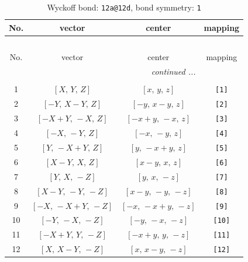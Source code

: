 \documentclass[fleqn,8pt]{jsarticle}
\begin{document}
\begin{longtable}{cccc}
\caption{Wyckoff bond: {\tt 12a@12d}, bond symmetry: {\tt 1}}
 \\
 \hline \hline
No. & vector & center & mapping \\ \hline \endfirsthead

\multicolumn{3}{l}{\tablename\ \thetable{}} \\
 \hline \hline
No. & vector & center & mapping \\ \hline \endhead

 \hline \hline
\multicolumn{3}{r}{\footnotesize\it continued ...} \\ \endfoot

 \hline \hline
\multicolumn{3}{r}{} \\ \endlastfoot

1 & $\left[ X,\, Y,\, Z \right]$ & $\left[ x,\, y,\, z \right]$ & {\tt [1]} \\ \hline
2 & $\left[ - Y,\, X - Y,\, Z \right]$ & $\left[ - y,\, x - y,\, z \right]$ & {\tt [2]} \\ \hline
3 & $\left[ - X + Y,\, - X,\, Z \right]$ & $\left[ - x + y,\, - x,\, z \right]$ & {\tt [3]} \\ \hline
4 & $\left[ - X,\, - Y,\, Z \right]$ & $\left[ - x,\, - y,\, z \right]$ & {\tt [4]} \\ \hline
5 & $\left[ Y,\, - X + Y,\, Z \right]$ & $\left[ y,\, - x + y,\, z \right]$ & {\tt [5]} \\ \hline
6 & $\left[ X - Y,\, X,\, Z \right]$ & $\left[ x - y,\, x,\, z \right]$ & {\tt [6]} \\ \hline
7 & $\left[ Y,\, X,\, - Z \right]$ & $\left[ y,\, x,\, - z \right]$ & {\tt [7]} \\ \hline
8 & $\left[ X - Y,\, - Y,\, - Z \right]$ & $\left[ x - y,\, - y,\, - z \right]$ & {\tt [8]} \\ \hline
9 & $\left[ - X,\, - X + Y,\, - Z \right]$ & $\left[ - x,\, - x + y,\, - z \right]$ & {\tt [9]} \\ \hline
10 & $\left[ - Y,\, - X,\, - Z \right]$ & $\left[ - y,\, - x,\, - z \right]$ & {\tt [10]} \\ \hline
11 & $\left[ - X + Y,\, Y,\, - Z \right]$ & $\left[ - x + y,\, y,\, - z \right]$ & {\tt [11]} \\ \hline
12 & $\left[ X,\, X - Y,\, - Z \right]$ & $\left[ x,\, x - y,\, - z \right]$ & {\tt [12]} \\
\end{longtable}
\end{document}
